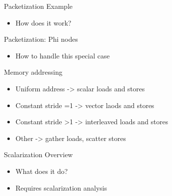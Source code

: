 
\begin{frame}{Packetization Example}

\begin{itemize}
    \item How does it work?
\end{itemize}

\end{frame}


\begin{frame}{Packetization: Phi nodes}

\begin{itemize}
    \item How to handle this special case
\end{itemize}

\end{frame}


\begin{frame}{Memory addressing}

\begin{itemize}
    \item Uniform address -> scalar loads and stores
    \item Constant stride =1 -> vector laods and stores
    \item Constant stride >1 -> interleaved loads and stores
    \item Other -> gather loads, scatter stores
\end{itemize}


\end{frame}



\begin{frame}{Scalarization Overview}

\begin{itemize}
    \item What does it do?
    \item Requires scalarization analysis
\end{itemize}

\end{frame}

